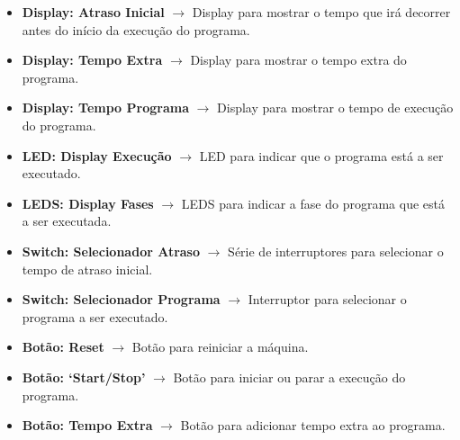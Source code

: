 \begin{itemize}
    \item \textbf{Display: Atraso Inicial} $\rightarrow$ Display para mostrar o tempo que irá decorrer antes do início da execução do programa.
    \item \textbf{Display: Tempo Extra} $\rightarrow$ Display para mostrar o tempo extra do programa.
    \item \textbf{Display: Tempo Programa} $\rightarrow$ Display para mostrar o tempo de execução do programa.
    \item \textbf{LED: Display Execução} $\rightarrow$ LED para indicar que o programa está a ser executado.
    \item \textbf{LEDS: Display Fases} $\rightarrow$ LEDS para indicar a fase do programa que está a ser executada.
    \item \textbf{Switch: Selecionador Atraso} $\rightarrow$ Série de interruptores para selecionar o tempo de atraso inicial.
    \item \textbf{Switch: Selecionador Programa} $\rightarrow$ Interruptor para selecionar o programa a ser executado.
    \item \textbf{Botão: Reset} $\rightarrow$ Botão para reiniciar a máquina.
    \item \textbf{Botão: `Start/Stop'} $\rightarrow$ Botão para iniciar ou parar a execução do programa.
    \item \textbf{Botão: Tempo Extra} $\rightarrow$ Botão para adicionar tempo extra ao programa.
\end{itemize}